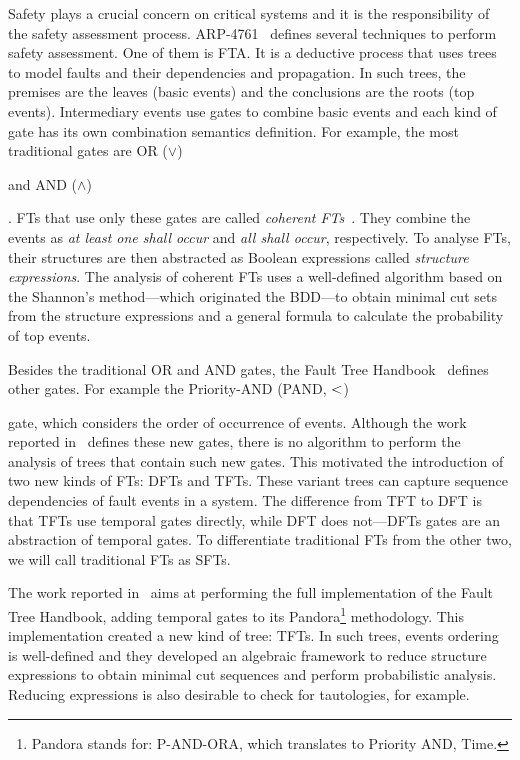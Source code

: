\documentclass[en,twoside,onehalfspacing,phd]{risethesis}
\def\FThandbook{Fault Tree Handbook~\cite{VGR+1981}\index{Fault Tree!Handbook}%
  \gdef\FThandbook{Fault Tree Handbook\index{Fault Tree!Handbook}\xspace}%
  \xspace}
\def\pandora{Pandora\footnote{Pandora stands for: P-AND-ORA, which translates to Priority AND, Time.}%
  \gdef\pandora{Pandora\xspace}%
  \xspace}
\def\ortext{OR ($\lor$)%
  \gdef\ortext{OR\xspace}%
  \xspace
}
\def\andtext{AND ($\land$)%
  \gdef\andtext{AND\xspace}%
  \xspace
}
\def\pandtext{Priority-AND (PAND, $\pand$)%
  \gdef\pandtext{PAND\xspace}%
  \xspace
}
\def\pand{\ensuremath\operatorname{<}}
\begin{document}
Safety plays a crucial concern on critical systems and it is the responsibility of the safety assessment process.
ARP-4761~\cite{SAE1996b} defines several techniques to perform safety assessment.
One of them is \ac{FTA}.
It is a deductive process that uses trees to model faults and their dependencies and propagation.
In such trees, the premises are the leaves (basic events) and the conclusions are the roots (top events).
Intermediary events use gates to combine basic events and each kind of gate has its own combination semantics definition.
For example, the most traditional gates are \ortext and \andtext.
\Acp{FT} that use only these gates are called \emph{coherent \aclp{FT}}~\cite{Andrews2001,AB2003,Oliv2006,CCR2008,Vaurio2016}.
They combine the events as \emph{at least one shall occur} and \emph{all shall occur}, respectively.
To analyse \aclp{FT}, their structures are then abstracted as Boolean expressions called \emph{structure expressions}.
The analysis of coherent \acp{FT} uses a well-defined algorithm based on the Shannon's method---which originated the \ac{BDD}---to obtain minimal cut sets from the structure expressions and a general formula to calculate the probability of top events.

Besides the traditional \ortext and \andtext gates, the \FThandbook defines other gates.
For example the \pandtext gate, which considers the order of occurrence of events.
Although the work reported in~\cite{VGR+1981} defines these new gates, there is no algorithm to perform the analysis of trees that contain such new gates.
This motivated the introduction of two new kinds of \aclp{FT}: \acp{DFT} and \acp{TFT}.
These variant trees can capture sequence dependencies of fault events in a system.
The difference from \ac{TFT} to \ac{DFT} is that \acp{TFT} use temporal gates directly, while \ac{DFT} does not---\acp{DFT} gates are an abstraction of temporal gates.
To differentiate traditional \aclp{FT} from the other two, we will call traditional \aclp{FT} as \acp{SFT}.

The work reported in~\cite{WP2009} aims at performing the full implementation of the \FThandbook, adding temporal gates to its \pandora methodology.
This implementation created a new kind of tree: \acp{TFT}.
In such trees, events ordering is well-defined and they developed an algebraic framework to reduce structure expressions to obtain minimal cut sequences and perform probabilistic analysis.
Reducing expressions is also desirable to check for tautologies, for example.
\end{document}
